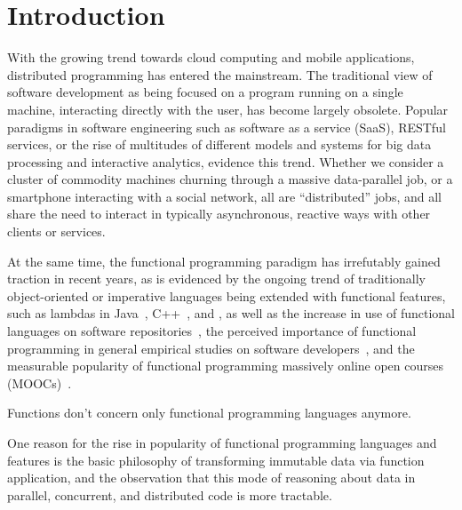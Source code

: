 \documentclass{llncs}
\begin{document}
\section{Introduction}

With the growing trend towards cloud computing and mobile applications,
distributed programming has entered the mainstream. The traditional view of
software development as being focused on a program running on a single
machine, interacting directly with the user, has become largely obsolete.
Popular paradigms in software engineering such as software as a service
(SaaS), RESTful services, or the rise of multitudes of different models and
systems for big data processing and interactive analytics, evidence this
trend.
Whether we consider a cluster of commodity machines
churning through a massive data-parallel job, or a smartphone interacting with
a social network, all are ``distributed'' jobs, and all share the need to
interact in typically asynchronous, reactive ways with other clients or
services.  

At the same time, the functional programming paradigm has irrefutably gained
traction in recent years, as is evidenced by the ongoing trend of
traditionally object-oriented or imperative languages being extended with
functional features, such as lambdas in Java~\cite{JavaLambdas},
C++~\cite{CplusplusLambas}, and , as well as the increase in
use of functional languages on software repositories~\cite{find-something},
the perceived importance of functional programming in general empirical
studies on software developers~\cite{PLAdoption}, and the measurable popularity of functional programming massively
online open courses (MOOCs)~\cite{ICSEMOOC}.

Functions don't concern only functional programming languages anymore.

One reason for the rise in
popularity of functional programming languages and features is the basic
philosophy of transforming immutable data via function application, and the
observation that this mode of reasoning about data in parallel, concurrent,
and distributed code is more tractable.

\end{document}
